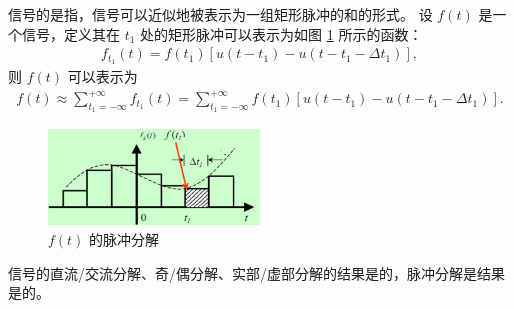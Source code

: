 \begin{definition}[信号的脉冲分解]
    信号的是指，信号可以近似地被表示为一组矩形脉冲的和的形式。
    设 $f(t)$ 是一个信号，定义其在 $t_1$ 处的矩形脉冲可以表示为如图 \ref{fig:rect-pulse-decomposition} 所示的函数：
    \begin{align*}
        f_{t_1}(t) = f(t_1)[u(t - t_1) - u(t - t_1 - \Delta t_1)],
    \end{align*}
    则 $f(t)$ 可以表示为
    \begin{align*}
        f(t) \approx \sum_{t_1 = -\infty}^{+\infty}f_{t_1}(t)
            = \sum_{t_1 = -\infty}^{+\infty}f(t_1)[u(t - t_1) - u(t - t_1 - \Delta t_1)].
    \end{align*}
    \begin{figure}[H]
        \centering
        \includegraphics[width=0.5\textwidth]{chap2/img/rect-pulse-decomposition.png}
        \caption{$f(t)$ 的脉冲分解}
        \label{fig:rect-pulse-decomposition}
    \end{figure}
\end{definition}

\begin{note}
    信号的直流/交流分解、奇/偶分解、实部/虚部分解的结果是的，脉冲分解是结果是的。
\end{note}
